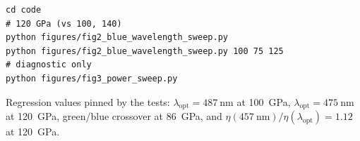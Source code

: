 \documentclass[preprint,12pt]{elsarticle}
\newcommand{\lopt}{\ensuremath{\lambda_{\mathrm{opt}}}}
\begin{document}
\begin{verbatim}
cd code
# 120 GPa (vs 100, 140)
python figures/fig2_blue_wavelength_sweep.py
python figures/fig2_blue_wavelength_sweep.py 100 75 125
# diagnostic only
python figures/fig3_power_sweep.py
\end{verbatim}

Regression values pinned by the tests: $\lopt = \SI{487}{\nano\meter}$ at
\SI{100}{\giga\pascal}, $\lopt = \SI{475}{\nano\meter}$ at
\SI{120}{\giga\pascal}, green/blue crossover at \SI{86}{\giga\pascal}, and
$\eta(\SI{457}{\nano\meter})/\eta(\lopt) = 1.12$ at \SI{120}{\giga\pascal}.



\end{document}
